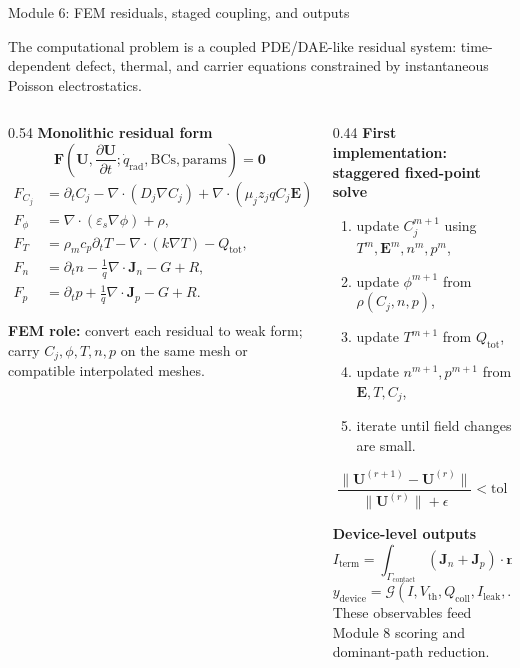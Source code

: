 \documentclass[aspectratio=169,9pt]{beamer}
\newcommand{\Uvec}{\bm{U}}
\newcommand{\Fvec}{\bm{F}}
\newcommand{\Evec}{\bm{E}}
\newcommand{\Jn}{\bm{J}_n}
\newcommand{\Jp}{\bm{J}_p}
\newcommand{\qrad}{\dot{q}_{\mathrm{rad}}}
\newcommand{\grad}{\nabla}
\newcommand{\diverg}{\nabla\!\cdot}
\newcommand{\epss}{\varepsilon_s}
\newcommand{\rhom}{\rho_m}
\newcommand{\cp}{c_p}
\begin{document}
\begin{frame}{Module 6: FEM residuals, staged coupling, and outputs}
\scriptsize

\begin{bluebox}
\centering
The computational problem is a coupled PDE/DAE-like residual system: time-dependent defect, thermal, and carrier equations constrained by instantaneous Poisson electrostatics.
\end{bluebox}

\vspace{1mm}
\begin{columns}[T,totalwidth=\textwidth]
\begin{column}{0.54\textwidth}
\textbf{Monolithic residual form}
\begin{equation*}
\boxed{
\Fvec\!\left(\Uvec,\frac{\partial\Uvec}{\partial t};\qrad,\mathrm{BCs},\mathrm{params}\right)=\bm{0}}
\end{equation*}
\begin{align*}
F_{C_j}&=\partial_t C_j-\diverg(D_j\grad C_j)+\diverg(\mu_jz_jqC_j\Evec)-R_j-S_j,\\
F_{\phi}&=\diverg(\epss\grad\phi)+\rho,\\
F_T&=\rhom\cp\partial_tT-\diverg(k\grad T)-Q_{\mathrm{tot}},\\
F_n&=\partial_t n-\frac{1}{q}\diverg\Jn-G+R,\\
F_p&=\partial_t p+\frac{1}{q}\diverg\Jp-G+R.
\end{align*}
\begin{orangebox}
\textbf{FEM role:} convert each residual to weak form; carry \(C_j,\phi,T,n,p\) on the same mesh or compatible interpolated meshes.
\end{orangebox}
\end{column}

\begin{column}{0.44\textwidth}
\textbf{First implementation: staggered fixed-point solve}
\begin{enumerate}\itemsep0.4mm
\item update \(C_j^{m+1}\) using \(T^m,\Evec^m,n^m,p^m\),
\item update \(\phi^{m+1}\) from \(\rho(C_j,n,p)\),
\item update \(T^{m+1}\) from \(Q_{\mathrm{tot}}\),
\item update \(n^{m+1},p^{m+1}\) from \(\Evec,T,C_j\),
\item iterate until field changes are small.
\end{enumerate}
\[
\boxed{\frac{\|\Uvec^{(r+1)}-\Uvec^{(r)}\|}{\|\Uvec^{(r)}\|+\epsilon}<\mathrm{tol}}
\]

\vspace{0.5mm}
\textbf{Device-level outputs}
\[
\boxed{I_{\mathrm{term}}=\int_{\Gamma_{\mathrm{contact}}}(\Jn+\Jp)\cdot\bm{n}\,d\Gamma}
\]
\[
\boxed{y_{\mathrm{device}}=\mathcal{G}(I,V_{\mathrm{th}},Q_{\mathrm{coll}},I_{\mathrm{leak}},\ldots)}
\]
These observables feed Module 8 scoring and dominant-path reduction.
\end{column}
\end{columns}
\end{frame}
\end{document}
